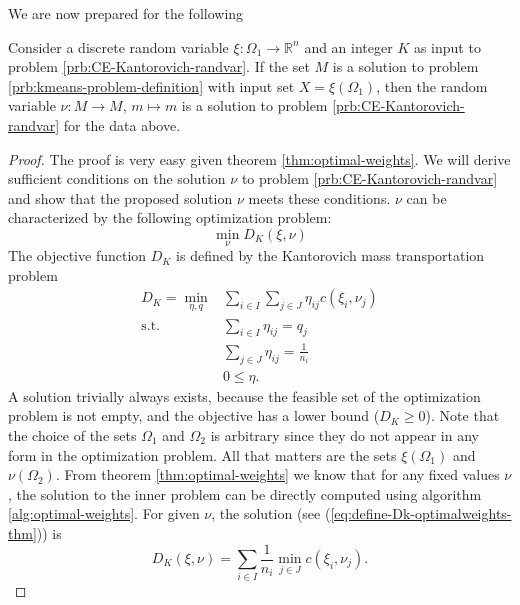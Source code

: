 We are now prepared for the following
\begin{thm}
Consider a discrete random variable $\xi : \Omega_1\rightarrow \mathbb{R}^n$ and an integer $K$ as input to problem \ref{prb:CE-Kantorovich-randvar}.
If the set $M$ is a solution to problem \ref{prb:kmeans-problem-definition} with input set $X=\xi(\Omega_1)$, then the random variable $\nu : M \rightarrow M,\, m\mapsto m$ is a solution to problem \ref{prb:CE-Kantorovich-randvar} for the data above.
\end{thm}
\begin{proof}
  The proof is very easy given theorem \ref{thm:optimal-weights}. 
  We will derive sufficient conditions on the solution $\nu$ to problem \ref{prb:CE-Kantorovich-randvar} and show that the proposed solution $\nu$ meets these conditions.
  $\nu$ can be characterized by the following optimization problem:
  \begin{equation}
    \label{eq:characterize-nu-in-problemequivalence-proof}
    \min\limits_{\nu}D_K(\xi,\nu)
  \end{equation}
  The objective function $D_K$ is defined by the Kantorovich mass transportation problem
  \begin{align}
    \label{eq:kantoro-in-problemequivalence-proof}
    D_K = \min\limits_{\eta, q}& \sum_{i\in I}\sum_{j\in J}\eta_{ij}c(\xi_i,\nu_j)\\
    \text{s.t.}&\sum_{i\in I}\eta_{ij} = q_j\\
    &\sum_{j\in J}\eta_{ij} = \frac{1}{n_i}\\
    &0\leq \eta.
  \end{align}
  A solution trivially always exists, because the feasible set of the optimization problem is not empty, and the objective has a lower bound ($D_K\geq 0$).
  Note that the choice of the sets $\Omega_1$ and $\Omega_2$ is arbitrary since they do not appear in any form in the optimization problem.
  All that matters are the sets $\xi(\Omega_1)$ and $\nu(\Omega_2)$.
  From theorem \ref{thm:optimal-weights} we know that for any fixed values $\nu$, the solution to the inner problem can be directly computed using algorithm \ref{alg:optimal-weights}.
  For given $\nu$, the solution (see (\ref{eq:define-Dk-optimalweights-thm})) is
  \begin{equation}
    \label{eq:repeat-Dk-optimalweights-for-kmeansproof}
    D_K(\xi,\nu) = \sum_{i\in I}\frac{1}{n_i}\min\limits_{j\in J}c(\xi_i,\nu_j).

\end{equation}
\end{proof}
